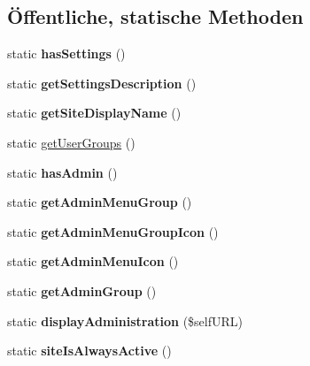 \subsection*{Öffentliche, statische Methoden}
\begin{DoxyCompactItemize}
\item 
\mbox{\label{classterminuebersicht_a3c15d634ad86482a9d6306c1ad3b68db}} 
static {\bfseries has\+Settings} ()
\item 
\mbox{\label{classterminuebersicht_a3d52684d5b659e2cb7235ad54f208405}} 
static {\bfseries get\+Settings\+Description} ()
\item 
\mbox{\label{classterminuebersicht_a934d20e7044156cb577175eee34e0345}} 
static {\bfseries get\+Site\+Display\+Name} ()
\item 
static \mbox{\hyperlink{classterminuebersicht_a791fcd31097bfc31234e2886a8f2f23d}{get\+User\+Groups}} ()
\item 
\mbox{\label{classterminuebersicht_a318c552c825bbb8fe020bf177932d0c2}} 
static {\bfseries has\+Admin} ()
\item 
\mbox{\label{classterminuebersicht_a72ddcf40874bee6a372bc5a0a88a9936}} 
static {\bfseries get\+Admin\+Menu\+Group} ()
\item 
\mbox{\label{classterminuebersicht_a908ebfabd1be07b1801fce52931ceec3}} 
static {\bfseries get\+Admin\+Menu\+Group\+Icon} ()
\item 
\mbox{\label{classterminuebersicht_aeffc04d7a84209b870f955179507bdb9}} 
static {\bfseries get\+Admin\+Menu\+Icon} ()
\item 
\mbox{\label{classterminuebersicht_a04306c1c7e094d821754dfa76db7fa73}} 
static {\bfseries get\+Admin\+Group} ()
\item 
\mbox{\label{classterminuebersicht_af664870382dc1f9178efcc328dcff22f}} 
static {\bfseries display\+Administration} (\$self\+U\+RL)
\item 
\mbox{\label{classterminuebersicht_ae759be51f395b23b32a8f03b0f22aa64}} 
static {\bfseries site\+Is\+Always\+Active} ()
\end{DoxyCompactItemize}
